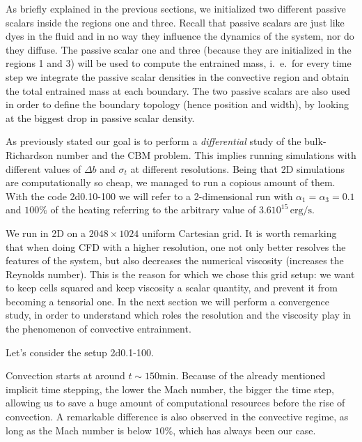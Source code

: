 As briefly explained in the previous sections, we initialized two different passive scalars inside the regions one and three. Recall that passive scalars are just like dyes in the fluid and in no way they influence the dynamics of the system, nor do they diffuse. The passive scalar one and three (because they are initialized in the regions 1 and 3) will be used to compute the entrained mass, i.\ e.\ for every time step we integrate the passive scalar densities in the convective region and obtain the total entrained mass at each boundary. The two passive scalars are also used in order to define the boundary topology (hence position and width), by looking at the biggest drop in passive scalar density.

As previously stated our goal is to perform a \textit{differential} study of the bulk-Richardson number and the CBM problem. This implies running simulations with different values of $\Delta b$ and $\sigma_t$ at different resolutions. Being that 2D simulations are computationally so cheap, we managed to run a copious amount of them. With the code 2d0.10-100 we will refer to a 2-dimensional run with $\alpha_{1} = \alpha_{3}=0.1$ and $100 \%$ of the heating referring to the arbitrary value of $3.6 10^{15} \, \mathrm{erg/s}$.

We run in 2D on a $2048 \times 1024$ uniform Cartesian grid. It is worth remarking that when doing CFD with a higher resolution, one not only better resolves the features of the system, but also decreases the numerical viscosity (increases the Reynolds number). This is the reason for which we chose this grid setup: we want to keep cells squared and keep viscosity a scalar quantity, and prevent it from becoming a tensorial one. In the next section we will perform a convergence study, in order to understand which roles the resolution and the viscosity play in the phenomenon of convective entrainment.


Let's consider the setup 2d0.1-100. 

Convection starts at around $t \sim 150 \mathrm{min}$. Because of the already mentioned implicit time stepping, the lower the Mach number, the bigger the time step, allowing us to save a huge amount of computational resources before the rise of convection. A remarkable difference is also observed in the convective regime, as long as the Mach number is below $10 \%$, which has always been our case.

